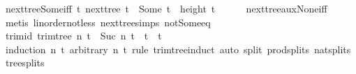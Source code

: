 \begin{isabellebody}
\isamarkupfalse%
%
\endisatagproof
{\isafoldproof}%
%
\isadelimproof
\isanewline
%
\endisadelimproof
\isanewline
{}\isamarkupfalse%
\ next{\isacharunderscore}{\kern0pt}tree{\isacharunderscore}{\kern0pt}Some{\isacharunderscore}{\kern0pt}iff{\isacharcolon}{\kern0pt}\ {\isachardoublequoteopen}{\isacharparenleft}{\kern0pt}{\isasymexists}t{\isacharprime}{\kern0pt}{\isachardot}{\kern0pt}\ next{\isacharunderscore}{\kern0pt}tree\ t\ {\isacharequal}{\kern0pt}\ Some\ t{\isacharprime}{\kern0pt}{\isacharparenright}{\kern0pt}\ {\isasymlongleftrightarrow}\ height\ t\ {\isasymge}\ {}{\isachardoublequoteclose}\isanewline
%
\isadelimproof
\ \ %
\endisadelimproof
%
\isatagproof
{}\isamarkupfalse%
\ next{\isacharunderscore}{\kern0pt}tree{\isacharunderscore}{\kern0pt}aux{\isacharunderscore}{\kern0pt}None{\isacharunderscore}{\kern0pt}iff\ \isamarkupfalse%
\ {\isacharparenleft}{\kern0pt}metis\ linorder{\isacharunderscore}{\kern0pt}not{\isacharunderscore}{\kern0pt}less\ next{\isacharunderscore}{\kern0pt}tree{\isachardot}{\kern0pt}simps\ not{\isacharunderscore}{\kern0pt}Some{\isacharunderscore}{\kern0pt}eq{\isacharparenright}{\kern0pt}%
\endisatagproof
{\isafoldproof}%
%
\isadelimproof
%
\endisadelimproof
%
\isadelimdocument
%
\endisadelimdocument
%
\isatagdocument
%
\isamarkuptrue%
%
\endisatagdocument
{\isafolddocument}%
%
\isadelimdocument
%
\endisadelimdocument
{}\isamarkupfalse%
\ trim{\isacharunderscore}{\kern0pt}id{\isacharcolon}{\kern0pt}\ {\isachardoublequoteopen}trim{\isacharunderscore}{\kern0pt}tree\ n\ t\ {\isacharequal}{\kern0pt}\ {\isacharparenleft}{\kern0pt}Suc\ n{\isacharprime}{\kern0pt}{\isacharcomma}{\kern0pt}\ t{\isacharprime}{\kern0pt}{\isacharparenright}{\kern0pt}\ {\isasymLongrightarrow}\ t\ {\isacharequal}{\kern0pt}\ t{\isacharprime}{\kern0pt}{\isachardoublequoteclose}\isanewline
%
\isadelimproof
\ \ %
\endisadelimproof
%
\isatagproof
{}\isamarkupfalse%
\ {\isacharparenleft}{\kern0pt}induction\ n\ t\ arbitrary{\isacharcolon}{\kern0pt}\ n{\isacharprime}{\kern0pt}\ t{\isacharprime}{\kern0pt}\ rule{\isacharcolon}{\kern0pt}\ trim{\isacharunderscore}{\kern0pt}tree{\isachardot}{\kern0pt}induct{\isacharparenright}{\kern0pt}\ {\isacharparenleft}{\kern0pt}auto\ split{\isacharcolon}{\kern0pt}\ prod{\isachardot}{\kern0pt}splits\ nat{\isachardot}{\kern0pt}splits\ tree{\isachardot}{\kern0pt}splits{\isacharparenright}{\kern0pt}%
\endisatagproof
{\isafoldproof}%
%
\isadelimproof
\isanewline
%
\endisadelimproof

\end{isabellebody}
